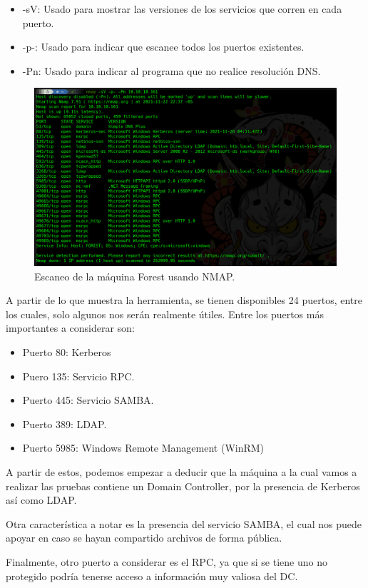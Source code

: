 \documentclass{article}
\begin{document}
\begin{itemize}
	\item -sV: Usado para mostrar las versiones de los servicios que corren en cada puerto.
	\item -p-: Usado para indicar que escanee todos los puertos existentes.
	\item -Pn: Usado para indicar al programa que no realice resolución DNS.
\end{itemize}
\begin{figure}[H]
	\center
	\includegraphics[width=\textwidth]{images/forest/escaneo_nmap.png}
	\caption{Escaneo de la máquina Forest usando NMAP.}
\end{figure}
A partir de lo que muestra la herramienta, se tienen disponibles 24 puertos, entre los cuales, solo algunos nos serán realmente útiles. Entre los puertos más importantes a considerar son:
\begin{itemize}
	\item Puerto 80: Kerberos
	\item Puero 135: Servicio RPC. 
	\item Puerto 445: Servicio SAMBA.
	\item Puerto 389: LDAP.
	\item Puerto 5985: Windows Remote Management (WinRM) 
\end{itemize}
A partir de estos, podemos empezar a deducir que la máquina a la cual vamos a realizar las pruebas contiene un Domain Controller, por la presencia de Kerberos así como LDAP. 

Otra característica a notar es la presencia del servicio SAMBA, el cual nos puede apoyar en caso se hayan compartido archivos de forma pública. 

Finalmente, otro puerto a considerar es el RPC, ya que si se tiene uno no protegido podría tenerse acceso a información muy valiosa del DC.
\end{document}

